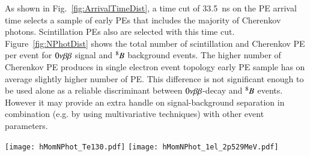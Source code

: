 As shown in Fig.~\ref{fig:ArrivalTimeDist}, a time cut of 33.5~ns on the PE arrival time selects a sample of early PEs that includes the majority of Cherenkov photons. Scintillation PEs also are selected with this time cut. Figure~\ref{fig:NPhotDist} shows the total number of scintillation and Cherenkov PE per event for $0\nu\beta\beta$ signal and $^{8}B$ background events. 
The higher number of Cherenkov PE produces in single electron event topology early PE sample has on average slightly higher number of PE. This difference is not significant enough to be used alone as a reliable discriminant between $0\nu\beta\beta$-decay and $^{8}B$ events. However it may provide an extra handle on signal-background separation in combination (e.g. by using multivariative techniques) with other event parameters.

\begin{figure*}[ht]
  \centering
  \texttt{[image: hMomNPhot\_Te130.pdf]}
  \texttt{[image: hMomNPhot\_1el\_2p529MeV.pdf]}
  \caption{Number of Cherenkov (\emph{dashed red line}), scintillation
    (\emph{dotted blue line}), and total (\emph{solid black line}) PEs
    for the simulation of 1000 $^{130}$Te 0{\nbb} decay (left panel)
    and $^8$B (\emph{right panel}) events.}
\label{fig:NPhotDist}
\end{figure*}

